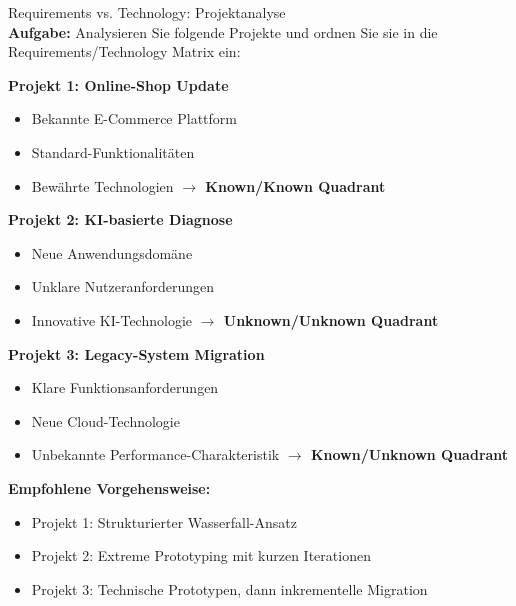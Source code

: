 \begin{example2}{Requirements vs. Technology: Projektanalyse}\\
\textbf{Aufgabe:} Analysieren Sie folgende Projekte und ordnen Sie sie in die Requirements/Technology Matrix ein:

\textbf{Projekt 1: Online-Shop Update}
\begin{itemize}
    \item Bekannte E-Commerce Plattform
    \item Standard-Funktionalitäten
    \item Bewährte Technologien
    \textbf{$\rightarrow$ Known/Known Quadrant}
\end{itemize}

\textbf{Projekt 2: KI-basierte Diagnose}
\begin{itemize}
    \item Neue Anwendungsdomäne
    \item Unklare Nutzeranforderungen
    \item Innovative KI-Technologie
    \textbf{$\rightarrow$ Unknown/Unknown Quadrant}
\end{itemize}

\textbf{Projekt 3: Legacy-System Migration}
\begin{itemize}
    \item Klare Funktionsanforderungen
    \item Neue Cloud-Technologie
    \item Unbekannte Performance-Charakteristik
    \textbf{$\rightarrow$ Known/Unknown Quadrant}
\end{itemize}

\textbf{Empfohlene Vorgehensweise:}
\begin{itemize}
    \item Projekt 1: Strukturierter Wasserfall-Ansatz
    \item Projekt 2: Extreme Prototyping mit kurzen Iterationen
    \item Projekt 3: Technische Prototypen, dann inkrementelle Migration
\end{itemize}
\end{example2}